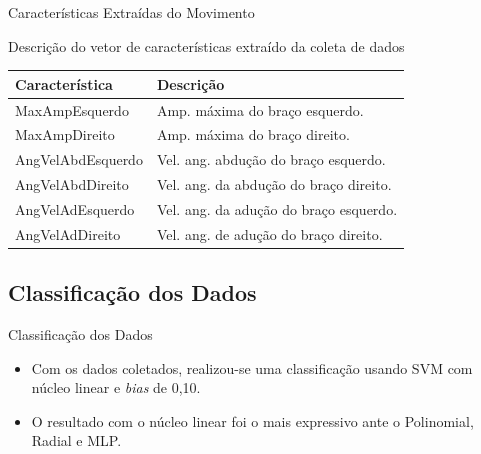 \documentclass{beamer}
\begin{document}
\begin{frame}{Características Extraídas do Movimento}
	\begin{block}{Descrição do vetor de características extraído da coleta de dados}
	\begin{table}[h]
	  \begin{tabular}{|l|l|}
	  \hline
	  {\bf Característica}  & {\bf Descrição}                                       \\ \hline
	  MaxAmpEsquerdo     & Amp. máxima do braço esquerdo. \\ \hline
	  MaxAmpDireito    & Amp. máxima do braço direito. \\ \hline
	  AngVelAbdEsquerdo  & Vel. ang. abdução do braço esquerdo. \\ \hline
	  AngVelAbdDireito & Vel. ang. da abdução do braço direito. \\ \hline
	  AngVelAdEsquerdo  & Vel. ang. da adução do braço esquerdo. \\ \hline
	  AngVelAdDireito & Vel. ang. de adução do braço direito. \\ \hline
	  \end{tabular}
	  \end{table}

	
	\end{block}
\end{frame}

\subsection{Classificação dos Dados}
\begin{frame}{Classificação dos Dados}
	\begin{block}{}
		\begin{itemize}[<+->]
			\item	Com os dados coletados, realizou-se uma classificação usando SVM com núcleo linear e \textit{bias} de 0,10.
			\item	O resultado com o núcleo linear foi o mais expressivo ante o Polinomial, Radial e MLP.
		\end{itemize}
	\end{block}
\end{frame}
\end{document}
